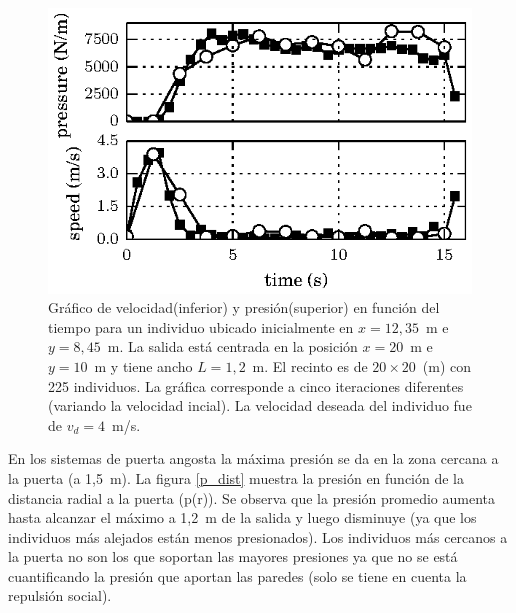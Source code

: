 \begin{figure}[H]
    \centering
    \includegraphics[scale=1.6]{figuras/p_vel_t_100_1_2.eps}
    \caption[width=5cm]{Gráfico de velocidad(inferior) y presión(superior) en función del tiempo para un individuo ubicado inicialmente en $x=12,35$~m e $y=8,45$~m.  La salida está centrada en la posición $x=20$~m e $y=10$~m y tiene ancho $L=1,2$~m. El recinto es de $20\times 20$~(m) con 225 individuos. La gráfica corresponde a cinco iteraciones diferentes (variando la velocidad incial). La velocidad deseada del individuo fue de $v_d=4$~m/s.}
    \label{pa_vel_t_100_1_2}
\end{figure}

En los sistemas de puerta angosta la máxima presión se da en la zona cercana a la puerta (a 1,5~m). La figura \ref{p_dist} muestra la presión en función de la distancia radial a la puerta (p(r)). Se observa que la presión promedio aumenta hasta alcanzar el máximo a 1,2~m de la salida y luego disminuye (ya que los individuos más alejados están menos presionados). Los individuos más cercanos a la puerta no son los que soportan las mayores presiones ya que no se está cuantificando la presión que aportan las paredes (solo se tiene en cuenta la repulsión social).   


